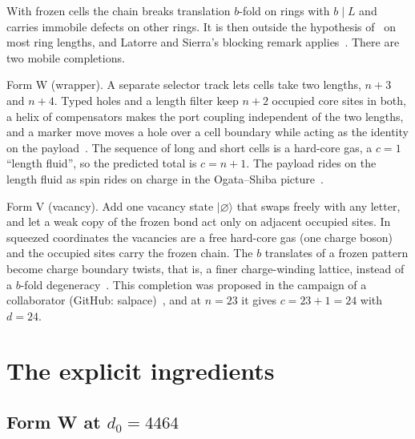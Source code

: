 \documentclass[11pt]{article}
\theoremstyle{definition}
\newcommand{\ket}[1]{|#1\rangle}
\begin{document}
With frozen cells the chain breaks translation $b$-fold on rings with $b\mid L$ and carries immobile defects on other rings. It is then outside the hypothesis of~\cite{LS} on most ring lengths, and Latorre and Sierra's blocking remark applies~\cite{redteam}. There are two mobile completions.

Form W (wrapper). A separate selector track lets cells take two lengths, $n+3$ and $n+4$. Typed holes and a length filter keep $n+2$ occupied core sites in both, a helix of compensators makes the port coupling independent of the two lengths, and a marker move moves a hole over a cell boundary while acting as the identity on the payload~\cite{C8,C32,C44}. The sequence of long and short cells is a hard-core gas, a $c=1$ ``length fluid'', so the predicted total is $c=n+1$. The payload rides on the length fluid as spin rides on charge in the Ogata--Shiba picture~\cite{OgataShiba}.

Form V (vacancy). Add one vacancy state $\ket{\varnothing}$ that swaps freely with any letter, and let a weak copy of the frozen bond act only on adjacent occupied sites. In squeezed coordinates the vacancies are a free hard-core gas (one charge boson) and the occupied sites carry the frozen chain. The $b$ translates of a frozen pattern become charge boundary twists, that is, a finer charge-winding lattice, instead of a $b$-fold degeneracy~\cite{campaign,C41}. This completion was proposed in the campaign of a collaborator (GitHub: salpace)~\cite{campaign}, and at $n=23$ it gives $c=23+1=24$ with $d=24$.

\section{The explicit ingredients}

\subsection{Form W at \texorpdfstring{$d_0=4464$}{d0=4464}}
\end{document}
